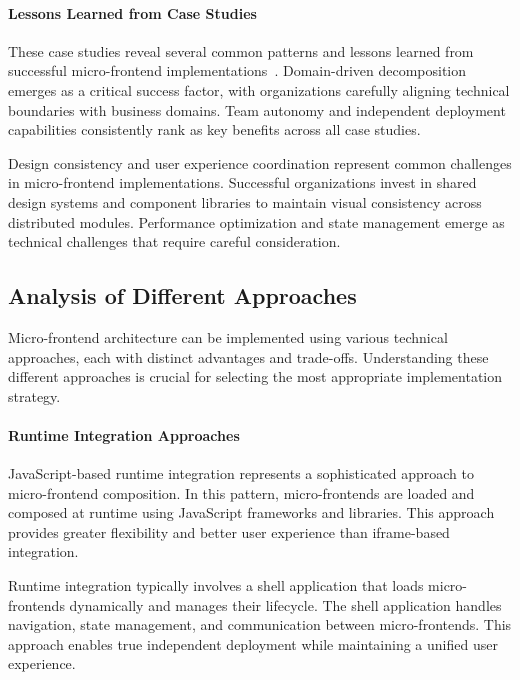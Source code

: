 \documentclass[12pt,a4paper]{report}
\begin{document}
\paragraph{Lessons Learned from Case Studies}

These case studies reveal several common patterns and lessons learned from successful micro-frontend implementations~\cite{casey2020microfrontends}. Domain-driven decomposition emerges as a critical success factor, with organizations carefully aligning technical boundaries with business domains. Team autonomy and independent deployment capabilities consistently rank as key benefits across all case studies.

Design consistency and user experience coordination represent common challenges in micro-frontend implementations. Successful organizations invest in shared design systems and component libraries to maintain visual consistency across distributed modules. Performance optimization and state management emerge as technical challenges that require careful consideration.

\subsection{Analysis of Different Approaches}

Micro-frontend architecture can be implemented using various technical approaches, each with distinct advantages and trade-offs. Understanding these different approaches is crucial for selecting the most appropriate implementation strategy.

\paragraph{Runtime Integration Approaches}

JavaScript-based runtime integration represents a sophisticated approach to micro-frontend composition. In this pattern, micro-frontends are loaded and composed at runtime using JavaScript frameworks and libraries. This approach provides greater flexibility and better user experience than iframe-based integration.

Runtime integration typically involves a shell application that loads micro-frontends dynamically and manages their lifecycle. The shell application handles navigation, state management, and communication between micro-frontends. This approach enables true independent deployment while maintaining a unified user experience.
\end{document}
